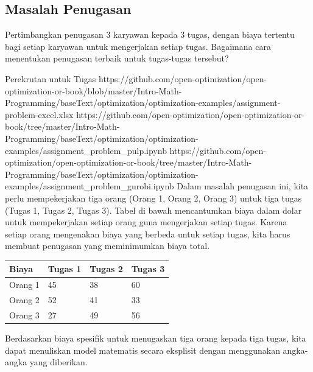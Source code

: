 \subsection{Masalah Penugasan}
Pertimbangkan penugasan $3$ karyawan kepada $3$ tugas, dengan biaya tertentu bagi setiap karyawan untuk mengerjakan setiap tugas. Bagaimana cara menentukan penugasan terbaik untuk tugas-tugas tersebut?

\begin{examplewithallcode}
{Perekrutan untuk Tugas}
{https://github.com/open-optimization/open-optimization-or-book/blob/master/Intro-Math-Programming/baseText/optimization/optimization-examples/assignment-problem-excel.xlsx}
{https://github.com/open-optimization/open-optimization-or-book/tree/master/Intro-Math-Programming/baseText/optimization/optimization-examples/assignment_problem_pulp.ipynb}
{https://github.com/open-optimization/open-optimization-or-book/tree/master/Intro-Math-Programming/baseText/optimization/optimization-examples/assignment_problem_gurobi.ipynb}
\label{example:hiring-for-tasks}
Dalam masalah penugasan ini, kita perlu mempekerjakan tiga orang (Orang 1, Orang 2, Orang 3) untuk tiga tugas (Tugas 1, Tugas 2, Tugas 3). Tabel di bawah mencantumkan biaya dalam dolar untuk mempekerjakan setiap orang guna mengerjakan setiap tugas. Karena setiap orang mengenakan biaya yang berbeda untuk setiap tugas, kita harus membuat penugasan yang meminimumkan biaya total.

\medskip
\noindent
\begin{center}
\begin{tabular}{llll}
    \hline
        Biaya & Tugas 1 & Tugas 2 & Tugas 3  \\ \hline
        Orang 1 & 45 & 38 & 60  \\ \hline
        Orang 2 & 52 & 41 & 33  \\ \hline
        Orang 3 & 27 & 49 & 56 \\ \hline
    \end{tabular}
\par{}\label{tab:modeling-linear-programming-tab06}%

\end{center}

Berdasarkan biaya spesifik untuk menugaskan tiga orang kepada tiga tugas, kita dapat menuliskan model matematis secara eksplisit dengan menggunakan angka-angka yang diberikan.
\end{examplewithallcode}
